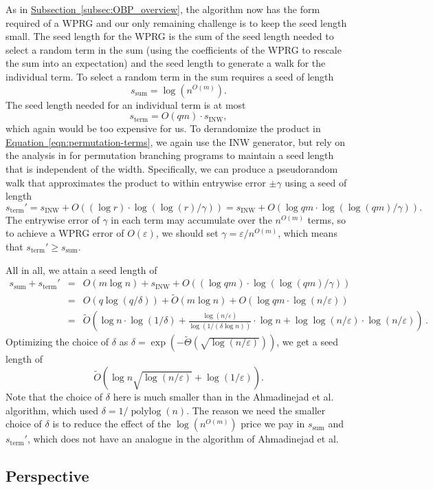 \documentclass[11pt]{article}
\numberwithin{equation}{section}
\theoremstyle{definition}
\theoremstyle{plain}
\newcommand{\expref}[2]{\hyperref[#2]{#1~\ref{#2}}}
\newcommand{\expeqref}[2]{\hyperref[#2]{#1~\eqref{#2}}}
\newcommand{\tO}{\widetilde{O}}
\newcommand{\eps}{\varepsilon}
\newcommand{\polylog}{\operatorname{polylog}}
\newcommand{\ssum}{s_{\mathrm{sum}}}
\newcommand{\sterm}{s_{\mathrm{term}}}
\newcommand{\sINW}{s_{\mathrm{INW}}}
\begin{document}
    As in \expref{Subsection}{subsec:OBP_overview}, the algorithm now has the form required of a WPRG and our only remaining challenge is to keep the seed length small. 
    The seed length
    for the WPRG is the sum of the seed length needed to select a random term in the sum (using the coefficients of the WPRG to rescale the sum into an expectation) and the seed length to generate a walk for the individual term.
    To select a random term in the sum requires a seed of length
    $$\ssum = \log (n^{O(m)}).$$
    The seed length needed for an individual term is at most $$\sterm = O(qm)\cdot \sINW,$$
    which again would be too expensive for us.
    To derandomize the product in \expeqref{Equation}{eqn:permutation-terms}, 
    we again use the INW generator, but
    rely on the analysis in \cite{HozaPyVa21} for permutation branching
    programs to maintain a seed length that is independent of the width.  Specifically, we can produce a pseudorandom walk that approximates the product to within entrywise error $\pm \gamma$ using a seed of length 
    $$\sterm' = \sINW+O((\log r)\cdot \log(\log(r)/\gamma))
    = \sINW + O(\log qm\cdot \log(\log(qm)/\gamma)).$$
    The entrywise error of $\gamma$ in each term may accumulate over the $n^{O(m)}$ terms, so to achieve a WPRG error of $O(\eps)$, we should set $\gamma=\eps/n^{O(m)}$, which means that $\sterm' \geq \ssum$.  
    
    All in all, we attain a seed length of
    \begin{eqnarray*}
    \ssum+\sterm' 
    &=& O(m\log n)+\sINW+O((\log qm)\cdot \log(\log(qm)/\gamma))\\
    &=& O(q\log(q/\delta)) + \tO(m\log n) + O(\log qm\cdot \log(n/\eps))\\
    &=& \tO\left(\log n\cdot \log(1/\delta) + \frac{\log(n/\eps)}{\log(1/(\delta\log n))}\cdot \log n + \log\log(n/\eps)\cdot \log(n/\eps)\right)\,.
    \end{eqnarray*}
    Optimizing the choice of $\delta$ as $\delta = \exp(-\widetilde{\Theta}(\sqrt{\log(n/\eps)}))$, we get a seed length of
    $$\tO(\log n\sqrt{\log(n/\eps)} + \log(1/\eps)).$$
    Note that the choice of $\delta$ here is much smaller than in 
    the %
Ahmadinejad  %
et al. algorithm, which used $\delta=1/\polylog(n)$.
    The reason we need the smaller choice of $\delta$ is to reduce the effect of the $\log(n^{O(m)})$ price we pay in $\ssum$ and $\sterm'$, which does not have an analogue in the algorithm of
%
Ahmadinejad  %
et al.
    
\subsection{Perspective}
\end{document}

